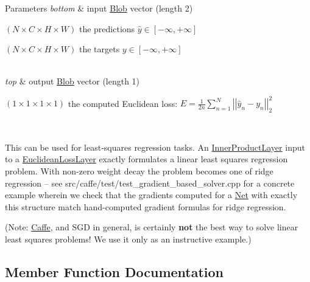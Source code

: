 \begin{DoxyParams}{Parameters}
{\em bottom} & input \hyperlink{classcaffe_1_1Blob}{Blob} vector (length 2)
\begin{DoxyEnumerate}
\item $ (N \times C \times H \times W) $ the predictions $ \hat{y} \in [-\infty, +\infty]$
\item $ (N \times C \times H \times W) $ the targets $ y \in [-\infty, +\infty]$ 
\end{DoxyEnumerate}\\
\hline
{\em top} & output \hyperlink{classcaffe_1_1Blob}{Blob} vector (length 1)
\begin{DoxyEnumerate}
\item $ (1 \times 1 \times 1 \times 1) $ the computed Euclidean loss\+: $ E = \frac{1}{2n} \sum\limits_{n=1}^N \left| \left| \hat{y}_n - y_n \right| \right|_2^2 $
\end{DoxyEnumerate}\\
\hline
\end{DoxyParams}
This can be used for least-\/squares regression tasks. An \hyperlink{classcaffe_1_1InnerProductLayer}{Inner\+Product\+Layer} input to a \hyperlink{classcaffe_1_1EuclideanLossLayer}{Euclidean\+Loss\+Layer} exactly formulates a linear least squares regression problem. With non-\/zero weight decay the problem becomes one of ridge regression -- see src/caffe/test/test\+\_\+gradient\+\_\+based\+\_\+solver.\+cpp for a concrete example wherein we check that the gradients computed for a \hyperlink{classcaffe_1_1Net}{Net} with exactly this structure match hand-\/computed gradient formulas for ridge regression.

(Note\+: \hyperlink{classcaffe_1_1Caffe}{Caffe}, and S\+GD in general, is certainly {\bfseries not} the best way to solve linear least squares problems! We use it only as an instructive example.) 

\subsection{Member Function Documentation}
